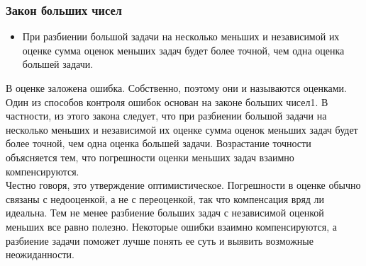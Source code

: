 \documentclass{../industrial-development}
\begin{document}
\begin{frame} \frametitle{Закон больших чисел}
\begin{itemize}
  \item При разбиении большой задачи на несколько меньших и независимой их оценке сумма оценок меньших задач будет более точной, чем одна оценка большей задачи. 
\end{itemize}
\end{frame}
\lecturenotes
В оценке заложена ошибка. Собственно, поэтому они и называются оценками. Один из способов контроля ошибок основан на законе больших чисел1. В частности, из этого закона следует, что при разбиении большой задачи на несколько меньших и независимой их оценке сумма оценок меньших задач будет более точной, чем одна оценка большей задачи. Возрастание точности объясняется тем, что погрешности оценки меньших задач взаимно компенсируются.\\
Честно говоря, это утверждение оптимистическое. Погрешности в оценке обычно связаны с недооценкой, а не с переоценкой, так что компенсация вряд ли идеальна. Тем не менее разбиение больших задач с независимой оценкой меньших все равно полезно. Некоторые ошибки взаимно компенсируются, а разбиение задачи поможет лучше понять ее суть и выявить возможные неожиданности.
\end{document}

